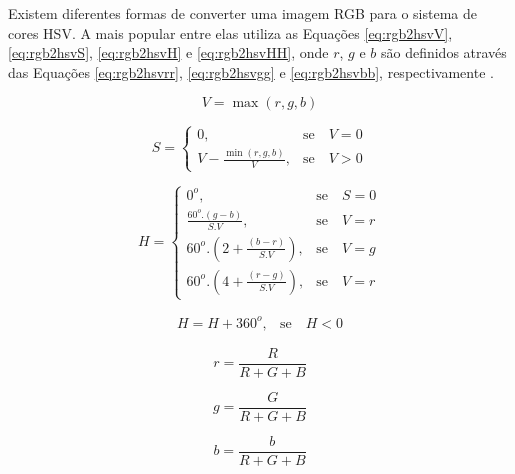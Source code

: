 \documentclass[	12pt, Times, openright, twoside, a4paper, english, brazil]{abntex2}
\begin{document}
Existem diferentes formas de converter uma imagem RGB para o sistema de cores HSV. A mais popular entre elas utiliza as Equações \ref{eq:rgb2hsvV}, \ref{eq:rgb2hsvS},  \ref{eq:rgb2hsvH} e \ref{eq:rgb2hsvHH}, onde $r$, $g$ e $b$ são definidos através das Equações \ref{eq:rgb2hsvrr}, \ref{eq:rgb2hsvgg} e \ref{eq:rgb2hsvbb}, respectivamente \cite{acharya2005image}.


\begin{equation}
\label{eq:rgb2hsvV}
V = \max{(r,g,b)}
\end{equation}

\begin{equation}
\label{eq:rgb2hsvS}
S=\left\{
\begin{array}{rc}

    0,&\mbox{se}\quad V = 0 \\
    V - \frac{\min{(r,g,b)}}{V}, &\mbox{se}\quad V>0

\end{array}\right.
\end{equation}

\begin{equation}
\label{eq:rgb2hsvH}
H=\left\{
\begin{array}{rc}

    0^o,&\mbox{se}\quad S = 0 \\
    \frac{60^o . (g-b)}{S . V},&\mbox{se}\quad V=r \\
    60^o . \left( 2 + \frac{(b-r)}{S . V} \right),&\mbox{se}\quad V=g \\
    60^o . \left( 4 + \frac{(r-g)}{S . V} \right),&\mbox{se}\quad V=r

\end{array}\right.
\end{equation}

\begin{equation}
\label{eq:rgb2hsvHH}
\begin{array}{rc}
    H=H+360^o, &\mbox{se} \quad H < 0
\end{array}
\end{equation}

\begin{equation}
\label{eq:rgb2hsvrr}
    r = \frac{R}{R+G+B}
\end{equation}

\begin{equation}
\label{eq:rgb2hsvgg}
    g = \frac{G}{R+G+B}
\end{equation}

\begin{equation}
\label{eq:rgb2hsvbb}
    b = \frac{b}{R+G+B}
\end{equation}
\end{document}
